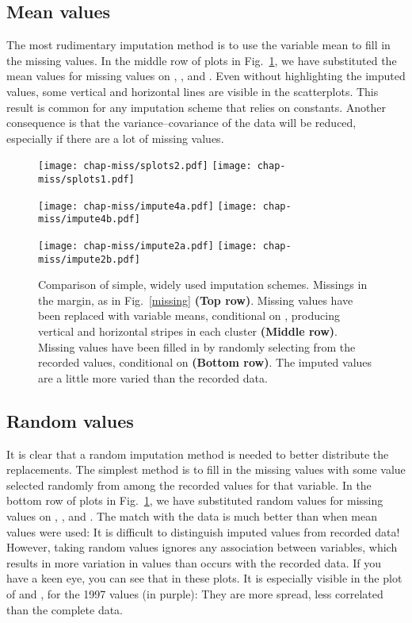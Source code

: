 
\subsection{Mean values}

The most rudimentary imputation method is to use the variable mean to
fill in the missing values.  In the middle row of plots in
Fig.~\ref{impute5}, we have substituted the mean values for missing
values on , , and
.  Even without highlighting the imputed values, some
vertical and horizontal lines are visible in the scatterplots.  This
result is common for any imputation scheme that relies on
constants. Another consequence is that the variance--covariance of the
data will be reduced, especially if there are a lot of missing values.

\begin{figure}[htbp]
\centerline{\texttt{[image: chap-miss/splots2.pdf]}
            \texttt{[image: chap-miss/splots1.pdf]}}
\centerline{
  \texttt{[image: chap-miss/impute4a.pdf]}
  \texttt{[image: chap-miss/impute4b.pdf]}
}
\centerline{
  \texttt{[image: chap-miss/impute2a.pdf]}
  \texttt{[image: chap-miss/impute2b.pdf]}
}
\caption[Comparison of simple, widely used imputation
schemes]{Comparison of simple, widely used imputation schemes.
Missings in the margin, as in Fig.~\ref{missing} {\bf (Top row)}.
Missing values have been replaced with variable means, conditional on
, producing vertical and horizontal stripes in each cluster
{\bf (Middle row)}.  Missing values have been filled in by randomly
selecting from the recorded values, conditional on  {\bf
(Bottom row)}. The imputed values are a little more varied than the
recorded data.  }
\label{impute5}
\end{figure}

\subsection{Random values}

It is clear that a random imputation method is needed to better
distribute the replacements.  The simplest method is to fill in the
missing values with some value selected randomly from among the
recorded values for that variable.  In the bottom row of plots in
Fig.~\ref{impute5}, we have substituted random values for missing
values on , , and
. The match with the data is much better than when mean
values were used: It is difficult to distinguish imputed values from
recorded data! However, taking random values ignores any association
between variables, which results in more variation in values than occurs
with the recorded data. If you have a keen eye, you can see that
in these plots.  It is especially visible in the plot of  and , for the 1997 values
(in purple): They are more spread, less correlated than the complete
data.

